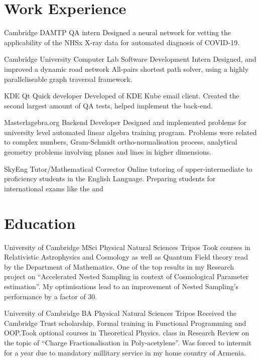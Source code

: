 \documentclass{CurriculumVitae}[10pt, draft, condensed]
\begin{document}
 \section*{Work Experience}
 {\setlength{\parindent}{0in}
    {Cambridge DAMTP} {QA intern} {Designed a neural
     network for vetting the applicability of the NHSx X-ray data for
     automated diagnosis of COVID-19. }
   
    {Cambridge University Computer Lab}
   {Software Development Intern} {Designed, and improved a dynamic
     road network All-pairs shortest path solver, using a highly
     paralleliseable graph traversal framework. }
   
    {KDE} {Qt Quick developer} {Developed of
     KDE Kube email client. Created the second largest amount of QA
     tests, helped implement the  back-end. }
   
    {Masterlagebra.org} {Backend Developer}
   {Designed and implemented problems for university level automated
     linear algebra training program. Problems were related to complex
     numbers, Gram-Schmidt ortho-normalisation process, analytical
     geometry problems involving planes and lines in higher
     dimensions. }

    {SkyEng} {Tutor/Mathematical Corrector}
   {Online tutoring of upper-intermediate to proficiency students in
     the English Language. Preparing students for international exams
     like the   and }

   \section*{Education}
   {University of Cambridge} {MSci } { Physical Natural
     Sciences Tripos} {Took courses in Relativistic Astrophysics and
     Cosmology as well as Quantum Field theory read by the Department
     of Mathematics. One of the top results in my Research project on
     ``Accelerated Nested Sampling in context of Cosmological
     Parameter estimation''. My optimisations lead to an improvement
     of Nested Sampling's performance by a factor of 30. }
   
    {University of Cambridge} {BA
     }{Physical Natural Sciences Tripos} {Received the
     Cambridge Trust scholarship. Formal training in Functional
     Programming and OOP.\@ Took optional courses in Theoretical
     Physics.  class in Research Review on the topic of
     ``Charge Fractionalisation in Poly-acetylene''. Was forced to
     intermit for a year due to mandatory millitary service in my home
     country of Armenia. }

}
\end{document}
